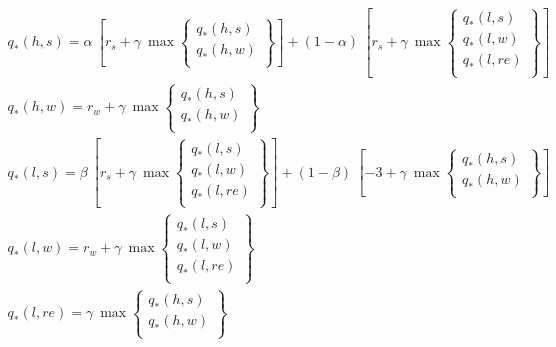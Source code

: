 \documentclass{article}
\begin{document}
\thispagestyle{empty}
\begin{displaymath}
\begin{array}{c}

q_*(h,s)=\alpha \ [r_s + \gamma \ \max
\left\{ \begin{array}{c}
q_*(h,s) \\
q_*(h,w) \\
\end{array} \right\}
]+
(1-\alpha) \ [r_s + \gamma \ \max
\left\{ \begin{array}{c}
q_*(l,s) \\
q_*(l,w) \\
q_*(l,re) \\
\end{array} \right\}
]\\

q_*(h,w)=r_w + \gamma \ \max
\left\{ \begin{array}{c}
q_*(h,s) \\
q_*(h,w) \\
\end{array} \right\} \\

q_*(l,s)=\beta \ [r_s + \gamma \ \max
\left\{ \begin{array}{c}
q_*(l,s) \\
q_*(l,w) \\
q_*(l,re) \\
\end{array} \right\}
]+
(1-\beta) \ [-3 + \gamma \ \max
\left\{ \begin{array}{c}
q_*(h,s) \\
q_*(h,w) \\
\end{array} \right\}
]\\


q_*(l,w)=r_w + \gamma \ \max
\left\{ \begin{array}{c}
q_*(l,s) \\
q_*(l,w) \\
q_*(l,re) \\
\end{array} \right\} \\


q_*(l,re)=\gamma \ \max
\left\{ \begin{array}{c}
q_*(h,s) \\
q_*(h,w) \\
\end{array} \right\} \\

\end{array}
\end{displaymath}
\end{document}
